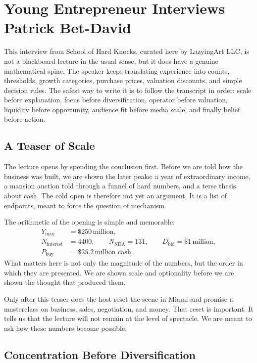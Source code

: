 \chapter{Young Entrepreneur Interviews Patrick Bet-David}

This interview from School of Hard Knocks, curated here by LazyingArt LLC, is not a blackboard lecture in the usual sense, but it does have a genuine mathematical spine. The speaker keeps translating experience into counts, thresholds, growth categories, purchase prices, valuation discounts, and simple decision rules. The safest way to write it is to follow the transcript in order: scale before explanation, focus before diversification, operator before valuation, liquidity before opportunity, audience fit before media scale, and finally belief before action.

\section{A Teaser of Scale}

The lecture opens by spending the conclusion first. Before we are told how the business was built, we are shown the later peaks: a year of extraordinary income, a mansion auction told through a funnel of hard numbers, and a terse thesis about cash. The cold open is therefore not yet an argument. It is a list of endpoints, meant to force the question of mechanism.

The arithmetic of the opening is simple and memorable:
\begin{align}
Y_{\max} &= \$250\,\text{million},\\
N_{\text{interest}} &= 4400,\qquad N_{\text{NDA}} = 131,\qquad D_{\text{bid}} = \$1\,\text{million},\\
P_{\text{buy}} &= \$25.2\,\text{million cash}.
\end{align}
What matters here is not only the magnitude of the numbers, but the order in which they are presented. We are shown scale and optionality before we are shown the thought that produced them.

Only after this teaser does the host reset the scene in Miami and promise a masterclass on business, sales, negotiation, and money. That reset is important. It tells us that the lecture will not remain at the level of spectacle. We are meant to ask how these numbers become possible.

\section{Concentration Before Diversification}

